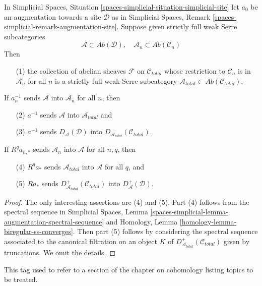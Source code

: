 \begin{lemma}
\label{lemma-trivialities-cohomological-descent-abelian}
In Simplicial Spaces, Situation
\ref{spaces-simplicial-situation-simplicial-site}
let $a_0$ be an augmentation towards a site $\mathcal{D}$ as in
Simplicial Spaces, Remark \ref{spaces-simplicial-remark-augmentation-site}.
Suppose given strictly full weak Serre subcategories
$$
\mathcal{A} \subset \textit{Ab}(\mathcal{D}),\quad
\mathcal{A}_n \subset \textit{Ab}(\mathcal{C}_n)
$$
Then
\begin{enumerate}
\item[(1)]
the collection of abelian sheaves $\mathcal{F}$ on $\mathcal{C}_{total}$
whose restriction to $\mathcal{C}_n$ is in $\mathcal{A}_n$ for all $n$
is a strictly full weak Serre subcategory
$\mathcal{A}_{total} \subset \textit{Ab}(\mathcal{C}_{total})$.
\end{enumerate}
If $a_n^{-1}$ sends $\mathcal{A}$ into $\mathcal{A}_n$
for all $n$, then
\begin{enumerate}
\item[(2)] $a^{-1}$ sends $\mathcal{A}$ into $\mathcal{A}_{total}$ and
\item[(3)] $a^{-1}$ sends $D_\mathcal{A}(\mathcal{D})$ into
$D_{\mathcal{A}_{total}}(\mathcal{C}_{total})$.
\end{enumerate}
If $R^qa_{n, *}$ sends $\mathcal{A}_n$ into $\mathcal{A}$
for all $n, q$, then
\begin{enumerate}
\item[(4)] $R^qa_*$ sends $\mathcal{A}_{total}$ into $\mathcal{A}$ for all $q$,
and
\item[(5)] $Ra_*$ sends $D_{\mathcal{A}_{total}}^+(\mathcal{C}_{total})$
into $D_\mathcal{A}^+(\mathcal{D})$.
\end{enumerate}
\end{lemma}

\begin{proof}
The only interesting assertions are (4) and (5).
Part (4) follows from the spectral sequence in
Simplicial Spaces, Lemma
\ref{spaces-simplicial-lemma-augmentation-spectral-sequence}
and Homology, Lemma \ref{homology-lemma-biregular-ss-converges}.
Then part (5) follows by considering the spectral sequence
associated to the canonical filtration on an object
$K$ of $D_{\mathcal{A}_{total}}^+(\mathcal{C}_{total})$ given by truncations.
We omit the details.
\end{proof}

\begin{remark}
\label{remark-cohomology-topics}
This tag used to refer to a section of the chapter on cohomology
listing topics to be treated.
\end{remark}

